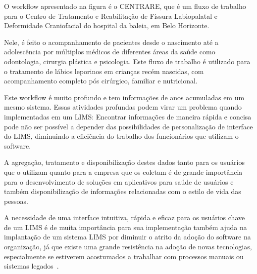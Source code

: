 O workflow apresentado na figura é o CENTRARE, que é um fluxo de trabalho para o Centro de Tratamento e Reabilitação de Fissura Labiopalatal e Deformidade Craniofacial do hospital da baleia, em Belo Horizonte.

Nele, é feito o acompanhamento de pacientes desde o nascimento até a adolescência por múltiplos médicos de diferentes áreas da saúde como odontologia, cirurgia plástica e psicologia. Este fluxo de trabalho é utilizado para o tratamento de lábios leporinos em crianças recém nascidas, com acompanhamento completo pós cirúrgico, familiar e nutricional.


Este workflow é muito profundo e tem informações de anos acumuladas em um mesmo sistema. Essas atividades profundas podem virar um problema quando implementadas em um LIMS: Encontrar informações de maneira rápida e concisa pode não ser possível a depender das possibilidades de personalização de interface do LIMS, diminuindo a eficiência do trabalho dos funcionários que utilizam o software.




A agregação, tratamento e disponibilização destes dados tanto para os usuários que o utilizam quanto para a empresa que os coletam é de grande importância para o desenvolvimento de soluções em aplicativos para saúde de usuários e também disponibilização de informações relacionadas com o estilo de vida das pessoas.


A necessidade de uma interface intuitiva, rápida e eficaz para os usuários chave de um LIMS é de muita importância para sua implementação também ajuda na implantação de um sistema LIMS por diminuir o atrito da adoção do software na organização, já que existe uma grande resistência na adoção de novas tecnologias, especialmente se estiverem acostumados a trabalhar com processos manuais ou sistemas legados~\cite{2018CommonAstrix}.


